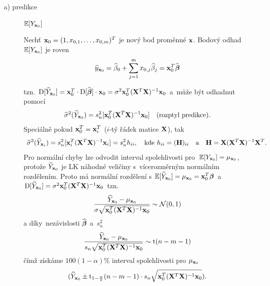 \begin{description}
	\item[a) predikce] $\mathbb{E} [Y_{\mathbf{x}_0}]$

Nechť $\mathbf{x}_0 = (1, x_{0,1},\dots, x_{0,m})^T$ je nový bod proměnné $\mathbf{x}$. Bodový odhad $\mathbb{E} [Y_{\mathbf{x}_0}]$ je roven
 $$
 \widehat{y}_{\mathbf{x}_0} = \widehat{\beta}_0 + \sum_{j = 1}^m x_{0,j} \widehat{\beta}_j = \mathbf{x}_0^T \widehat{\boldsymbol{\beta}}
 $$

tzn. $\mathrm{D} [\widehat{Y}_{\mathbf{x}_0}] = \mathbf{x}_0^T \cdot \mathrm{D} [\widehat{\boldsymbol{\beta}}] \cdot \mathbf{x}_0 = \sigma^2 \mathbf{x}_0^T(\mathbf{X}^T \mathbf{X})^{-1} \mathbf{x}_0$ a~může být odhadnut pomocí
 $$
 \widehat{\sigma}^2(\widehat{Y}_{\mathbf{x}_0}) = s_n^2 [\mathbf{x}_0^T(\mathbf{X}^T \mathbf{X})^{-1} \mathbf{x}_0] \quad \text{(rozptyl predikce)}.
 $$
 Speciálně pokud $\mathbf{x}_0^T = \mathbf{x}_i^T$ ($i$-tý řádek matice $\mathbf{X}$), tak
 $$
  \widehat{\sigma}^2(\widehat{Y}_{\mathbf{x}_i}) = s_n^2 [\mathbf{x}_i^T(\mathbf{X}^T \mathbf{X})^{-1} \mathbf{x}_i] = s_n^2 h_{ii}, \quad \text{kde } h_{ii} = (\textbf{H})_{ii} \quad \text{a} \quad \textbf{H} = \mathbf{X} (\mathbf{X}^T  \mathbf{X})^{-1} \mathbf{X}^T.
 $$
Pro normální chyby lze odvodit interval spolehlivosti pro~$\mathbb{E} [Y_{\mathbf{x}_0}] = \mu_{\mathbf{x}_0}$, protože $\widehat{Y}_{\mathbf{x}_0}$ je LK náhodné veličiny s~vícerozměrným normálním rozdělením. Proto má normální rozdělení s $\mathbb{E} [\widehat{Y}_{\mathbf{x}_0}] = \mu_{\mathbf{x}_0} = \mathbf{x}_0^T \boldsymbol{\beta}$ a~$\mathrm{D} [\widehat{Y}_{\mathbf{x}_0}] = \sigma^2 \mathbf{x}_0^T(\mathbf{X}^T \mathbf{X})^{-1} \mathbf{x}_0$
tzn.
 $$
\frac{\widehat{Y}_{\mathbf{x}_0} - \mu_{\mathbf{x}_0}}{\sigma \sqrt{\mathbf{x}_0^T(\mathbf{X}^T \mathbf{X})^{-1} \mathbf{x}_0}} \sim \mathcal{N}(0,1)
 $$
a díky~nezávislosti $\widehat{\boldsymbol{\beta}}$ a~$s_n^2$
 $$
 \frac{\widehat{Y}_{\mathbf{x}_0} - \mu_{\mathbf{x}_0}}{s_n \sqrt{\mathbf{x}_0^T(\mathbf{X}^T \mathbf{X})^{-1} \mathbf{x}_0}} \sim \mathrm{t}(n-m-1)
 $$
 čímž získáme $100(1-\alpha)\%$ interval spolehlivosti pro $\mu_{\mathbf{x}_0}$
 $$
   (\widehat{Y}_{\mathbf{x}_0} \pm \mathrm{t}_{1-\frac{\alpha}{2}}(n-m-1) \cdot s_n \sqrt{\mathbf{x}_0^T(\mathbf{X}^T \mathbf{X})^{-1} \mathbf{x}_0}).
 $$
	\begin{figure}[h]
	\centering
\end{figure}
\end{description}
